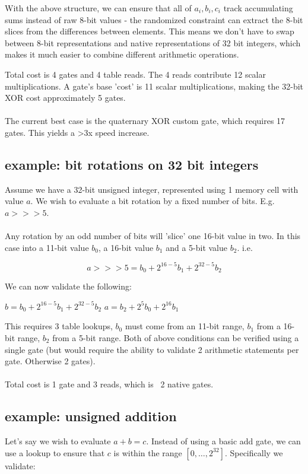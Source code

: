 \documentclass[11pt]{article} %
\begin{document}
With the above structure, we can ensure that all of $a_i, b_i, c_i$ track accumulating sums instead of raw 8-bit values - the randomized constraint can extract the 8-bit slices from the differences between elements. This means we don't have to swap between 8-bit representations and native representations of 32 bit integers, which makes it much easier to combine different arithmetic operations.

Total cost is 4 gates and 4 table reads. The 4 reads contribute 12 scalar multiplications. A gate's base 'cost' is 11 scalar multiplications, making the 32-bit XOR cost approximately 5 gates.
\\
\\
The current best case is the quaternary XOR custom gate, which requires 17 gates. This yields a >3x speed increase.

\subsection{example: bit rotations on 32 bit integers}

Assume we have a 32-bit unsigned integer, represented using 1 memory cell with value $a$. We wish to evaluate a bit rotation by a fixed number of bits. E.g. $a >>> 5$.
\\
\\
Any rotation by an odd number of bits will 'slice' one 16-bit value in two. In this case into a 11-bit value $b_0$, a 16-bit value $b_1$ and a 5-bit value $b_2$. i.e.

$$a >>> 5 = b_0 + 2^{16 - 5}b_1 + 2^{32 - 5}b_2$$

We can now validate the following:

$b =  b_0 + 2^{16 - 5}b_1 + 2^{32 - 5}b_2$
$a = b_2 + 2^5b_0 + 2^16b_1$

This requires 3 table lookups, $b_0$ must come from an 11-bit range, $b_1$ from a 16-bit range, $b_2$ from a 5-bit range. Both of above conditions can be verified using a single gate (but would require the ability to validate 2 arithmetic statements per gate. Otherwise 2 gates).
\\
\\
Total cost is 1 gate and 3 reads, which is ~2 native gates.

\subsection{example: unsigned addition}

Let's say we wish to evaluate $a + b = c$. Instead of using a basic add gate, we can use a lookup to ensure that $c$ is within the range $[0, \ldots, 2^{32}]$. Specifically we validate:
\end{document}
